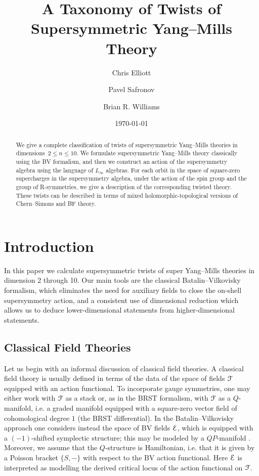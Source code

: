 \documentclass[10pt, oneside]{article}
\title{A Taxonomy of Twists of Supersymmetric Yang--Mills Theory}
\author{Chris Elliott\and Pavel Safronov \and Brian R. Williams}
\date{\today}
\begin{document}
\maketitle

\begin{abstract}
We give a complete classification of twists of supersymmetric Yang--Mills theories in dimensions~$2\leq n \leq 10$.
We formulate supersymmetric Yang--Mills theory classically using the BV formalism, and then we construct an action of the supersymmetry algebra using the language of $L_\infty$ algebras.  For each orbit in the space of square-zero supercharges in the supersymmetry algebra, under the action of the spin group and the group of R-symmetries, we give a description of the corresponding twisted theory.  These twists can be described in terms of mixed holomorphic-topological versions of Chern--Simons and BF theory. 
\end{abstract}

\pagestyle{intro}
\setcounter{tocdepth}{2}
\tableofcontents

\section*{Introduction} 
\label{sect:intro}

In this paper we calculate supersymmetric twists of super Yang--Mills theories in dimension 2 through 10. Our main tools are the classical Batalin--Vilkovisky formalism, which eliminates the need for auxiliary fields to close the on-shell supersymmetry action, and a consistent use of dimensional reduction which allows us to deduce lower-dimensional statements from higher-dimensional statements.

\subsection*{Classical Field Theories}

Let us begin with an informal discussion of classical field theories. A classical field theory is usually defined in terms of the data of the space of fields $\mathcal F$ equipped with an action functional. To incorporate gauge symmetries, one may either work with $\mathcal F$ as a stack or, as in the BRST formalism, with $\mathcal F$ as a $Q$-manifold, i.e. a graded manifold equipped with a square-zero vector field of cohomological degree $1$ (the BRST differential). In the Batalin--Vilkovisky \cite{BatalinVilkovisky} approach one considers instead the space of BV fields $\mathcal E$, which is equipped with a $(-1)$-shifted symplectic structure; this may be modeled by a $QP$-manifold \cite{Schwarz}. Moreover, we assume that the $Q$-structure is Hamiltonian, i.e. that it is given by a Poisson bracket $\{S, -\}$ with respect to the BV action functional. Here $\mathcal E$ is interpreted as modelling the derived critical locus of the action functional on $\mathcal F$.
\end{document}
